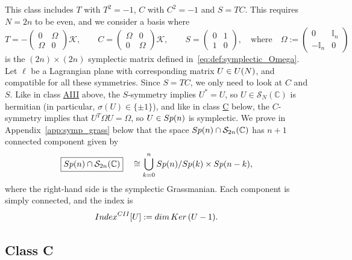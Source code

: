 \documentclass[11pt]{amsart}
\numberwithin{equation}{section} %
\newcommand\1{{\mathds 1}}
\def\C{{\mathbb C}}
\def\bbI{{\mathbb I}}
\def\cK{{\mathcal K}}
\def\cS{{\mathcal S}}
\def\rCII{{\rm CII}}
\def\U{{\rm U}}
\def\Sp{{\rm Sp}}
\def\Index{{\rm Index}}
\def\Ker{{\rm Ker }}
\def\dim{{\rm dim }}
\begin{document}
This class includes $T$ with $T^2=-1$, $C$ with $C^2=-1$ and $S=TC$. This requires $N=2n$ to be even, and we consider a basis where
$$
T =  - \begin{pmatrix}	0 &  \Omega \\ \Omega & 0 \end{pmatrix} \cK, \qquad 
C= \begin{pmatrix} \Omega & 0\\ 0 & \Omega \end{pmatrix}\cK, \qquad 
S = \begin{pmatrix}	0 & 1 \\ 1 & 0 \end{pmatrix}, \quad \text{where} \quad
\Omega :=  \begin{pmatrix}	0 & \bbI_n \\ - \bbI_n & 0 \end{pmatrix}
$$
is the $(2n) \times (2n)$ symplectic matrix defined in~\eqref{eq:def:symplectic_Omega}. Let $\ell$ be a Lagrangian plane with corresponding matrix $U \in \U(N)$, and compatible for all these symmetries. Since $S=TC$, we only need to look at $C$ and $S$. Like in class \hyperref[sec:class_AIII]{AIII} above, the $S$-symmetry implies $U^*= U$, so  $U \in \cS_N(\mathbb C)$ is hermitian (in particular, $\sigma(U) \in \{ \pm 1\}$), and like in class \hyperref[sec:class_C]{C} below, the $C$-symmetry implies that $U^T \Omega U = \Omega$, so $U \in \Sp(n)$ is symplectic. We prove in Appendix~\ref{app:symp_grass} below that the space $\Sp(n) \cap \cS_{2n}(\C)$ has $n+1$ connected component given by 
$$
    \boxed{ \Sp(n) \cap \cS_{2n}(\C)} \quad \cong \bigcup_{k=0}^n \Sp(n) / \Sp(k) \times \Sp(n-k),
$$
where the right-hand side is the symplectic Grassmanian. Each component is simply connected, and the index is $$\Index^{\rCII}[U] := \dim \, \Ker \, (U-1).$$ 


\subsection{Class C}
\label{sec:class_C}
\end{document}
